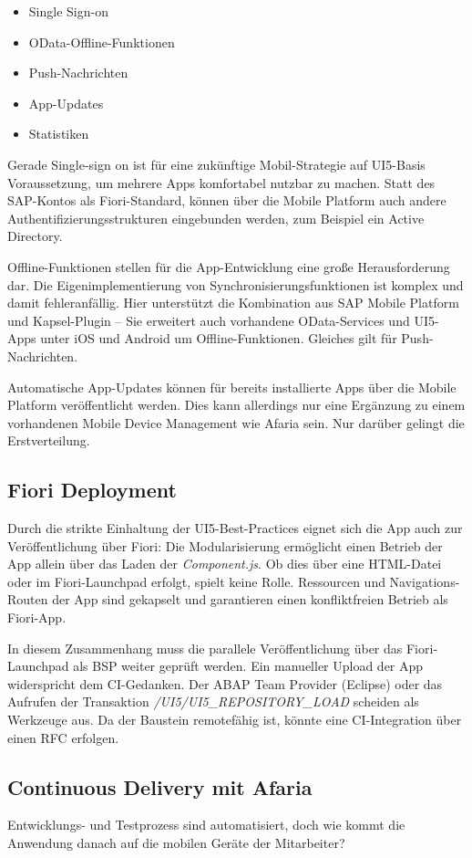 \begin{itemize}
	\item Single Sign-on
	\item OData-Offline-Funktionen
	\item Push-Nachrichten
	\item App-Updates
	\item Statistiken
\end{itemize}
Gerade Single-sign on ist für eine zukünftige Mobil-Strategie auf UI5-Basis Voraussetzung, um mehrere Apps komfortabel nutzbar zu machen. Statt des SAP-Kontos als Fiori-Standard, können über die Mobile Platform auch andere Authentifizierungsstrukturen eingebunden werden, zum Beispiel ein Active Directory.

Offline-Funktionen stellen für die App-Entwicklung eine große Herausforderung dar. Die Eigenimplementierung von Synchronisierungsfunktionen ist komplex und damit fehleranfällig. Hier unterstützt die Kombination aus SAP Mobile Platform und Kapsel-Plugin -- Sie erweitert auch vorhandene OData-Services und UI5-Apps unter iOS und Android um Offline-Funktionen. Gleiches gilt für Push-Nachrichten.

Automatische App-Updates können für bereits installierte Apps über die Mobile Platform veröffentlicht werden. Dies kann allerdings nur eine Ergänzung zu einem vorhandenen Mobile Device Management wie Afaria sein. Nur darüber gelingt die Erstverteilung.

\subsection{Fiori Deployment}
Durch die strikte Einhaltung der UI5-Best-Practices eignet sich die App auch zur Veröffentlichung über Fiori: Die Modularisierung ermöglicht einen Betrieb der App allein über das Laden der \textit{Component.js}. Ob dies über eine HTML-Datei oder im Fiori-Launchpad erfolgt, spielt keine Rolle. Ressourcen und Navigations-Routen der App sind gekapselt und garantieren einen konfliktfreien Betrieb als Fiori-App.

In diesem Zusammenhang muss die parallele Veröffentlichung über das Fiori-Launchpad als BSP weiter geprüft werden. Ein manueller Upload der App widerspricht dem CI-Gedanken. Der ABAP Team Provider (Eclipse) oder das Aufrufen der Transaktion \textit{/UI5/UI5\_REPOSITORY\_LOAD} scheiden als Werkzeuge aus. Da der Baustein remotefähig ist, könnte eine CI-Integration über einen RFC erfolgen.

\subsection{Continuous Delivery mit Afaria}
Entwicklungs- und Testprozess sind automatisiert, doch wie kommt die Anwendung danach auf die mobilen Geräte der Mitarbeiter?

